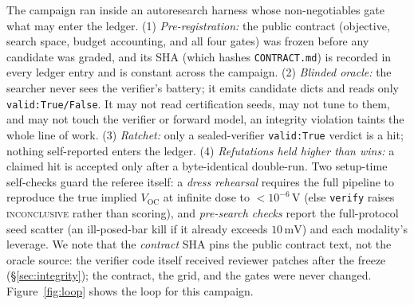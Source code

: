 \documentclass[11pt]{article}
\newcommand{\Voc}{V_{\mathrm{OC}}}
\newcommand{\mV}{\,\mathrm{mV}}
\begin{document}
The campaign ran inside an autoresearch harness whose non-negotiables gate what may enter the ledger. (1) \emph{Pre-registration:} the public contract (objective, search space, budget accounting, and all four gates) was frozen before any candidate was graded, and its SHA (which hashes \texttt{CONTRACT.md}) is recorded in every ledger entry and is constant across the campaign. (2) \emph{Blinded oracle:} the searcher never sees the verifier's battery; it emits candidate dicts and reads only \texttt{valid:True/False}. It may not read certification seeds, may not tune to them, and may not touch the verifier or forward model, an integrity violation taints the whole line of work. (3) \emph{Ratchet:} only a sealed-verifier \texttt{valid:True} verdict is a hit; nothing self-reported enters the ledger. (4) \emph{Refutations held higher than wins:} a claimed hit is accepted only after a byte-identical double-run. Two setup-time self-checks guard the referee itself: a \emph{dress rehearsal} requires the full pipeline to reproduce the true implied $\Voc$ at infinite dose to $<10^{-6}\,\mathrm{V}$ (else \texttt{verify} raises \textsc{inconclusive} rather than scoring), and \emph{pre-search checks} report the full-protocol seed scatter (an ill-posed-bar kill if it already exceeds $10\mV$) and each modality's leverage. We note that the \emph{contract} SHA pins the public contract text, not the oracle source: the verifier code itself received reviewer patches after the freeze (\S\ref{sec:integrity}); the contract, the grid, and the gates were never changed. Figure~\ref{fig:loop} shows the loop for this campaign.
\end{document}
